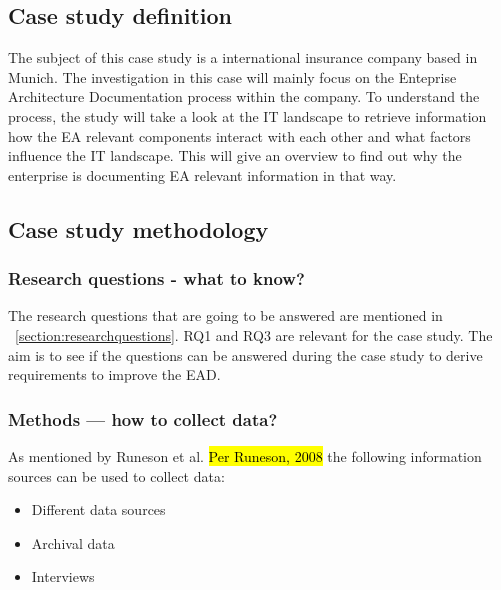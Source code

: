 \subsection{Case study definition}\label{subsection:casestudyobjectives}

The subject of this case study is a international insurance company based in Munich. The investigation in this case will mainly focus on the Enteprise Architecture Documentation process within the company. To understand the process, the study will take a look at the IT landscape to retrieve information how the EA relevant components interact with each other and what factors influence the IT landscape. This will give an overview to find out why the enterprise is documenting EA relevant information in that way.

\subsection{Case study methodology}\label{subsection:casestudymethodology}

\subsubsection{Research questions -  what to know?}
The research questions that are going to be answered are mentioned in ~\ref{section:researchquestions}.
RQ1 and RQ3 are relevant for the case study. The aim is to see if the questions can be answered during the case study to derive requirements to improve the EAD.

\subsubsection{Methods — how to collect data?}

As mentioned by Runeson et al. \hl{Per Runeson, 2008} the following information sources can be used to collect data:

\begin{itemize}
    \item Different data sources
    \item Archival data
    \item Interviews
\end{itemize}

